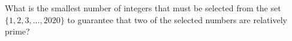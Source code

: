 What is the smallest number of integers that must be selected from the set $\{1,2,3,\dots,2020\}$ to guarantee that two of the selected numbers are relatively prime?
